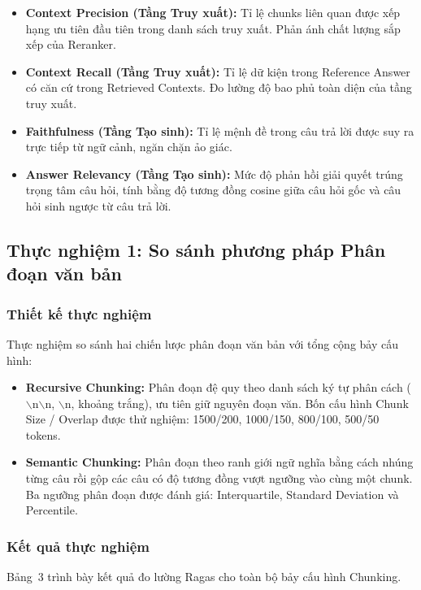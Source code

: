 ﻿\documentclass[12pt]{article}
\begin{document}
\begin{itemize}
    \item \textbf{Context Precision (Tầng Truy xuất):} Tỉ lệ chunks liên quan được xếp hạng ưu tiên đầu tiên trong danh sách truy xuất. Phản ánh chất lượng sắp xếp của Reranker.
    \item \textbf{Context Recall (Tầng Truy xuất):} Tỉ lệ dữ kiện trong Reference Answer có căn cứ trong Retrieved Contexts. Đo lường độ bao phủ toàn diện của tầng truy xuất.
    \item \textbf{Faithfulness (Tầng Tạo sinh):} Tỉ lệ mệnh đề trong câu trả lời được suy ra trực tiếp từ ngữ cảnh, ngăn chặn ảo giác.
    \item \textbf{Answer Relevancy (Tầng Tạo sinh):} Mức độ phản hồi giải quyết trúng trọng tâm câu hỏi, tính bằng độ tương đồng cosine giữa câu hỏi gốc và câu hỏi sinh ngược từ câu trả lời.
\end{itemize}

\subsection{Thực nghiệm 1: So sánh phương pháp Phân đoạn văn bản}

\subsubsection{Thiết kế thực nghiệm}

Thực nghiệm so sánh hai chiến lược phân đoạn văn bản với tổng cộng bảy cấu hình:
\begin{itemize}
    \item \textbf{Recursive Chunking:} Phân đoạn đệ quy theo danh sách ký tự phân cách ($\backslash$n$\backslash$n, $\backslash$n, khoảng trắng), ưu tiên giữ nguyên đoạn văn. Bốn cấu hình Chunk Size / Overlap được thử nghiệm: 1500/200, 1000/150, 800/100, 500/50 tokens.
    \item \textbf{Semantic Chunking:} Phân đoạn theo ranh giới ngữ nghĩa bằng cách nhúng từng câu rồi gộp các câu có độ tương đồng vượt ngưỡng vào cùng một chunk. Ba ngưỡng phân đoạn được đánh giá: Interquartile, Standard Deviation và Percentile.
\end{itemize}

\subsubsection{Kết quả thực nghiệm}

Bảng~3 trình bày kết quả đo lường Ragas cho toàn bộ bảy cấu hình Chunking.
\end{document}

